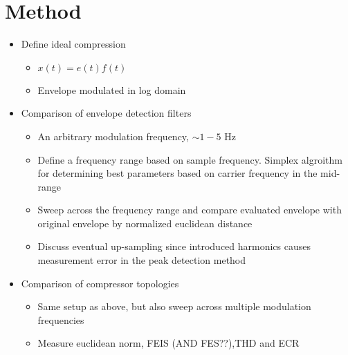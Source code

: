 \documentclass[../main2.tex]{subfiles}
\providecommand{\rootdir}{..}
\begin{document}
\section{Method}
\begin{itemize}
\item{Define ideal compression}
\begin{itemize}
	\item{$x(t) = e(t)f(t)$}
	\item{Envelope modulated in log domain}
\end{itemize}
\item{Comparison of envelope detection filters}
\begin{itemize}
	\item{An arbitrary modulation frequency, $\sim 1-5$ Hz}	
	\item{Define a frequency range based on sample frequency. Simplex algroithm for determining best parameters based on carrier frequency in the mid-range}
	\item{Sweep across the frequency range and compare evaluated envelope with original envelope by normalized euclidean distance}
	\item{Discuss eventual up-sampling since introduced harmonics causes measurement error in the peak detection method}
\end{itemize}
\item{Comparison of compressor topologies}
\begin{itemize}
	\item{Same setup as above, but also sweep across multiple modulation frequencies}
	\item{Measure euclidean norm, FEIS (AND FES??),THD and ECR}
\end{itemize}
\end{itemize}





\end{document}
